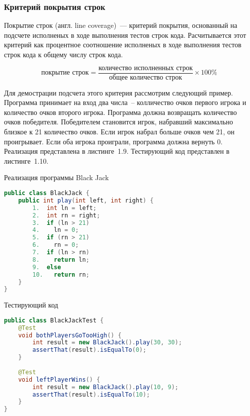 \subsubsection{Критерий покрытия строк}

Покрытие строк (англ. line coverage)~--- критерий покрытия, основанный на подсчете исполненых в ходе выполнения тестов строк кода. Расчитывается этот критерий как процентное соотношение исполненых в ходе выполнения тестов строк кода к общему числу строк кода.

\[ \text{покрытие строк} = \frac{\text{количество исполненных строк}}{\text{общее количество строк}}  \times 100 \% \]

Для демострации подсчета этого критерия рассмотрим следующий пример. Программа принимает на вход два числа~-- колличество очков первого игрока и количество очков второго игрока. Программа должна возвращать количество очков победителя. Победителем становится игрок, набравший максимально близкое к 21 количество очков. Если игрок набрал больше очков чем 21, он проигрывает. Если оба игрока проиграли, программа должна вернуть 0. Реализация представлена в листинге~1.9. Тестирующий код представлен в листинге~1.10.

\begin{ListingEnv}[!h]%
	\captiondelim{ } %
	\caption{Реализация программы Black Jack}
	\begin{lstlisting}[language={Java}]
public class BlackJack {
	public int play(int left, int right) {
		1.  int ln = left;
		2.  int rn = right;
		3.  if (ln > 21)
		4.    ln = 0;
		5.  if (rn > 21)
		6.    rn = 0;
		7.  if (ln > rn)
		8.    return ln;
		9.  else
		10.   return rn;
	}
}
	\end{lstlisting}
\end{ListingEnv}%

\begin{ListingEnv}[!h]%
	\captiondelim{ } %
	\caption{Тестирующий код}
	\begin{lstlisting}[language={Java}]
public class BlackJackTest {
	@Test
	void bothPlayersGoTooHigh() {
		int result = new BlackJack().play(30, 30);
		assertThat(result).isEqualTo(0);
	}
	
	@Test
	void leftPlayerWins() {
		int result = new BlackJack().play(10, 9);
		assertThat(result).isEqualTo(10);
	}
}
	\end{lstlisting}
\end{ListingEnv}%


